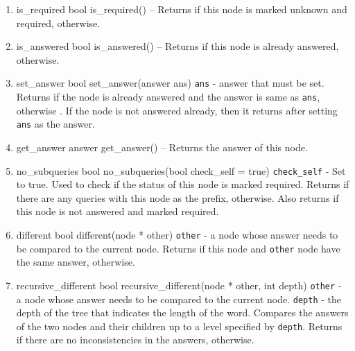 \begin{enumerate}
\begin{detail}
\end{detail}
\item \begin{detail}
{is\_required}
{bool is\_required()}
{--}
{Returns \true if this node is marked unknown and required, \false otherwise.} 
\end{detail}
\item \begin{detail}
{is\_answered}
{bool is\_answered()}
{--}
{Returns \true if this node is already answered, \false otherwise.} 
\end{detail}
\item \begin{detail}
{set\_answer}
{bool set\_answer(answer ans)}
{\texttt{ans} - answer that must be set.}
{Returns \true if the node is already answered and the answer is same as \texttt{ans}, otherwise \false. If the node is not answered already, then it returns \true after setting \texttt{ans} as the answer.} 
\end{detail}
\item \begin{detail}
{get\_answer}
{answer get\_answer()}
{--}
{Returns the answer of this node.} 
\end{detail}
\item \begin{detail}
{no\_subqueries}
{bool no\_subqueries(bool check\_self = true)}
{\texttt{check\_self} - Set to true. Used to check if the status of this node is marked required. }
{Returns \true if there are any queries with this node as the prefix, \false otherwise. Also returns \false if this node is not answered and marked required.} 
\end{detail}
\item \begin{detail}
{different}
{bool different(node * other)}
{\texttt{other} - a node whose answer needs to be compared to the current node. }
{Returns \true if this node and \texttt{other} node have the same answer, \false otherwise. } 
\end{detail}
\item \begin{detail}
{recursive\_different}
{bool recursive\_different(node * other, int depth)}
{\texttt{other} - a node whose answer needs to be compared to the current node.
 \texttt{depth} - the depth of the tree that indicates the length of the word. }
{Compares the answers of the two nodes and their children up to a level specified by \texttt{depth}. Returns \true if there are no inconsistencies in the answers, \false otherwise. } 

\end{detail}
\end{enumerate}
